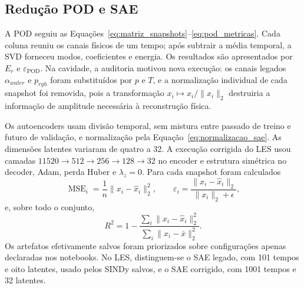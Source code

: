 \documentclass[12pt,a4paper]{article}
\begin{document}
\subsection{Redução POD e SAE}
A POD seguiu as Equações~\eqref{eq:matriz_snapshots}--\eqref{eq:pod_metricas}. Cada coluna reuniu os canais físicos de um tempo; após subtrair a média temporal, a SVD forneceu modos, coeficientes e energia. Os resultados são apresentados por $E_r$ e $\varepsilon_{\mathrm{POD}}$. Na cavidade, a auditoria motivou nova execução: os canais legados $\alpha_{water}$ e $p_{rgh}$ foram substituídos por $p$ e $T$, e a normalização individual de cada snapshot foi removida, pois a transformação $x_i\mapsto x_i/\lVert x_i\rVert_2$ destruiria a informação de amplitude necessária à reconstrução física.

Os autoencoders usam divisão temporal, sem mistura entre passado de treino e futuro de validação, e normalização pela Equação~\eqref{eq:normalizacao_sae}. As dimensões latentes variaram de quatro a 32. A execução corrigida do LES usou camadas $11520\!\rightarrow512\!\rightarrow256\!\rightarrow128\!\rightarrow32$ no encoder e estrutura simétrica no decoder, Adam, perda Huber e $\lambda_z=0$. Para cada snapshot foram calculados
\begin{equation}
\operatorname{MSE}_i=\frac{1}{n}\lVert x_i-\widehat x_i\rVert_2^2,
\qquad
\varepsilon_i=\frac{\lVert x_i-\widehat x_i\rVert_2}{\lVert x_i\rVert_2+\epsilon},
\label{eq:metricas_snapshot}
\end{equation}
e, sobre todo o conjunto,
\begin{equation}
R^2=1-\frac{\sum_i\lVert x_i-\widehat x_i\rVert_2^2}
{\sum_i\lVert x_i-\bar x\rVert_2^2}.
\label{eq:r2}
\end{equation}
Os artefatos efetivamente salvos foram priorizados sobre configurações apenas declaradas nos notebooks. No LES, distinguem-se o SAE legado, com 101 tempos e oito latentes, usado pelos SINDy salvos, e o SAE corrigido, com 1001 tempos e 32 latentes.
\end{document}
